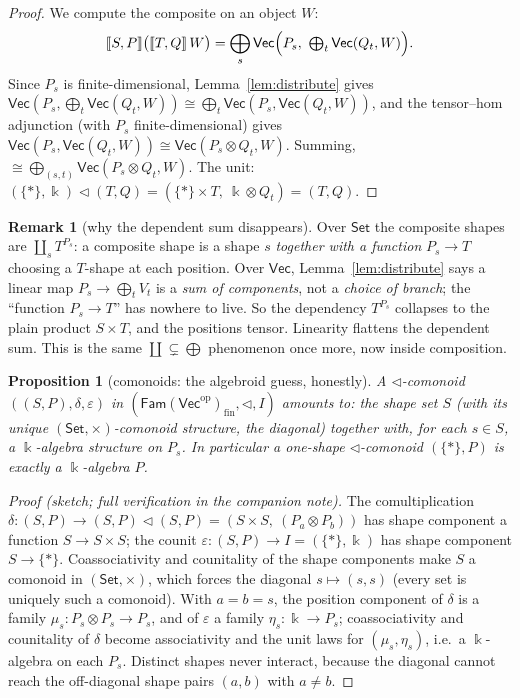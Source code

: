 \documentclass[11pt]{amsart}
\theoremstyle{plain}
\newtheorem{proposition}[theorem]{Proposition}
\theoremstyle{definition}
\newtheorem{remark}[theorem]{Remark}
\renewcommand{\Vec}{\mathsf{Vec}}
\newcommand{\Set}{\mathsf{Set}}
\newcommand{\Fam}{\mathsf{Fam}}
\newcommand{\op}{\mathrm{op}}
\newcommand{\ext}[1]{\llbracket #1 \rrbracket}
\newcommand{\fld}{\Bbbk}
\newcommand{\iso}{\cong}
\DeclareMathOperator{\dcoprod}{\textstyle\coprod}
\begin{document}
\begin{proof}
We compute the composite on an object $W$:
\[
  \ext{S,P}\bigl(\ext{T,Q}\,W\bigr)
  =\bigoplus_s\Vec\Bigl(P_s,\ \textstyle\bigoplus_t\Vec(Q_t,W)\Bigr).
\]
Since $P_s$ is finite-dimensional, Lemma~\ref{lem:distribute} gives
$\Vec(P_s,\bigoplus_t\Vec(Q_t,W))\iso\bigoplus_t\Vec(P_s,\Vec(Q_t,W))$, and the
tensor--hom adjunction (with $P_s$ finite-dimensional) gives
$\Vec(P_s,\Vec(Q_t,W))\iso\Vec(P_s\otimes Q_t,W)$. Summing,
$\iso\bigoplus_{(s,t)}\Vec(P_s\otimes Q_t,W)$. The unit:
$(\{*\},\fld)\lhd(T,Q)=(\{*\}\times T,\ \fld\otimes Q_t)=(T,Q)$.
\end{proof}

\begin{remark}[why the dependent sum disappears]
Over $\Set$ the composite shapes are $\dcoprod_{s}T^{P_s}$: a composite shape is
a shape $s$ \emph{together with a function} $P_s\to T$ choosing a $T$-shape at
each position. Over $\Vec$, Lemma~\ref{lem:distribute} says a linear map
$P_s\to\bigoplus_t V_t$ is a \emph{sum of components}, not a \emph{choice of
branch}; the ``function $P_s\to T$'' has nowhere to live. So the dependency
$T^{P_s}$ collapses to the plain product $S\times T$, and the positions tensor.
Linearity flattens the dependent sum. This is the same $\dcoprod\subsetneq
\bigoplus$ phenomenon once more, now inside composition.
\end{remark}

\begin{proposition}[comonoids: the algebroid guess, honestly]\label{prop:comonoid}
A $\lhd$-comonoid $((S,P),\delta,\varepsilon)$ in
$(\Fam(\Vec^\op)_{\mathrm{fin}},\lhd,I)$ amounts to: the shape set $S$ (with its
unique $(\Set,\times)$-comonoid structure, the diagonal) together with, for each
$s\in S$, a $\fld$-algebra structure on $P_s$. In particular a one-shape
$\lhd$-comonoid $(\{*\},P)$ is exactly a $\fld$-algebra $P$.
\end{proposition}

\begin{proof}[Proof {\normalfont(sketch; full verification in the companion note)}]
The comultiplication $\delta\colon(S,P)\to(S,P)\lhd(S,P)=(S\times S,\
(P_a\otimes P_b))$ has shape component a function $S\to S\times S$; the counit
$\varepsilon\colon(S,P)\to I=(\{*\},\fld)$ has shape component $S\to\{*\}$.
Coassociativity and counitality of the shape components make $S$ a comonoid in
$(\Set,\times)$, which forces the diagonal $s\mapsto(s,s)$ (every set is
uniquely such a comonoid). With $a=b=s$, the position component of $\delta$ is a
family $\mu_s\colon P_s\otimes P_s\to P_s$, and of $\varepsilon$ a family
$\eta_s\colon\fld\to P_s$; coassociativity and counitality of $\delta$ become
associativity and the unit laws for $(\mu_s,\eta_s)$, i.e.\ a $\fld$-algebra on
each $P_s$. Distinct shapes never interact, because the diagonal cannot reach
the off-diagonal shape pairs $(a,b)$ with $a\neq b$.
\end{proof}
\end{document}
